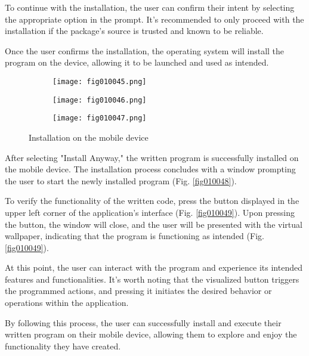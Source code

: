 To continue with the installation, the user can confirm their intent by selecting the appropriate option in the prompt. It's recommended to only proceed with the installation if the package's source is trusted and known to be reliable.

Once the user confirms the installation, the operating system will install the program on the device, allowing it to be launched and used as intended.

\begin{figure}[H]
   \begin{subfigure}{0.31\textwidth}
   \texttt{[image: fig010045.png]}
   \label{fig010045}
   \end{subfigure}
   \begin{subfigure}{0.31\textwidth}
   \texttt{[image: fig010046.png]}
   \label{fig010046}
   \end{subfigure}
   \begin{subfigure}{0.31\textwidth}
   \texttt{[image: fig010047.png]}
   \label{fig010047}
   \end{subfigure}
   \caption{Installation on the mobile device}
\end{figure}

After selecting "Install Anyway," the written program is successfully installed on the mobile device. The installation process concludes with a window prompting the user to start the newly installed program (Fig. \ref{fig010048}).

To verify the functionality of the written code, press the button displayed in the upper left corner of the application's interface (Fig. \ref{fig010049}). Upon pressing the button, the window will close, and the user will be presented with the virtual wallpaper, indicating that the program is functioning as intended (Fig. \ref{fig010049}).

At this point, the user can interact with the program and experience its intended features and functionalities. It's worth noting that the visualized button triggers the programmed actions, and pressing it initiates the desired behavior or operations within the application.

By following this process, the user can successfully install and execute their written program on their mobile device, allowing them to explore and enjoy the functionality they have created.

